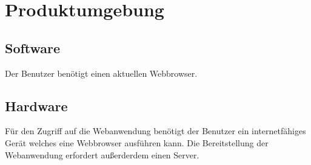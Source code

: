 \section{Produktumgebung}

\subsection{Software}

Der Benutzer benötigt einen aktuellen \gls{Webbrowser}.

\subsection{Hardware}

Für den Zugriff auf die \gls{Webanwendung} benötigt der Benutzer ein internetfähiges Gerät welches eine \gls{Webbrowser} ausführen kann.  
Die Bereitstellung der \gls{Webanwendung} erfordert außerderdem einen Server.